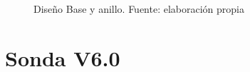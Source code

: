 \begin{appendices}
\begin{figure}[ht]
\centering
{}
\caption{Dise\~no Base y anillo. Fuente: elaboración propia}
\label{fig:BaseAnilloV5}
\end{figure}

\section*{Sonda V6.0}

\end{appendices}
